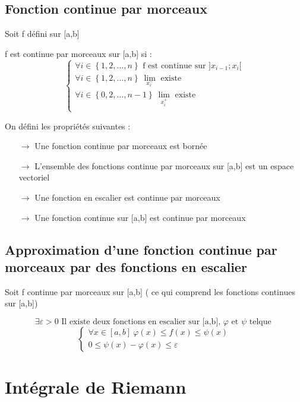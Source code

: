 \subsection{Fonction continue par morceaux}
Soit f défini sur [a,b]
\begin{de}
 f est continue par morceaux sur [a,b] si :
\[\left\{\begin{array}{l}
   \forall i \in \left\lbrace1,2,...,n\right\rbrace \mbox{ f est continue sur }]x_{i-1};x_i[\\
   \forall i \in \left\lbrace1,2,...,n\right\rbrace~ \underset{x_{i}^-}\lim\mbox{ existe }\\
    \forall i \in \left\lbrace0,2,...,n-1\right\rbrace~ \underset{x_{i}^+}\lim\mbox{ existe }\\
  \end{array}\right.
\]
\end{de}
\begin{prop}
 On défini les propriétés suivantes :
\begin{itemize}
 \item[$\rightarrow$] Une fonction continue par morceaux est bornée
 \item[$\rightarrow$] L'ensemble des fonctions continue par morceaux sur [a,b] est un espace vectoriel
 \item[$\rightarrow$] Une fonction en escalier est continue par morceaux
 \item[$\rightarrow$] Une fonction continue sur [a,b] est continue par morceaux
\end{itemize}
\end{prop}

\subsection{Approximation d'une fonction continue par morceaux par des fonctions en escalier}
Soit f continue par morceaux sur [a,b] ( ce qui comprend les fonctions continues sur [a,b])
\begin{de}
$$\exists \varepsilon > 0 \mbox{ Il existe deux fonctions en escalier sur [a,b], }\varphi \mbox{ et } \psi \mbox{ telque } $$
\[\left\{\begin{array}{c}
  \forall x \in [a,b]~ \varphi(x)\leq f(x) \leq \psi(x)\\
  0 \leq \psi(x) - \varphi(x) \leq \varepsilon 
  \end{array}\right.
\]
\end{de}
\section{Intégrale de Riemann}
